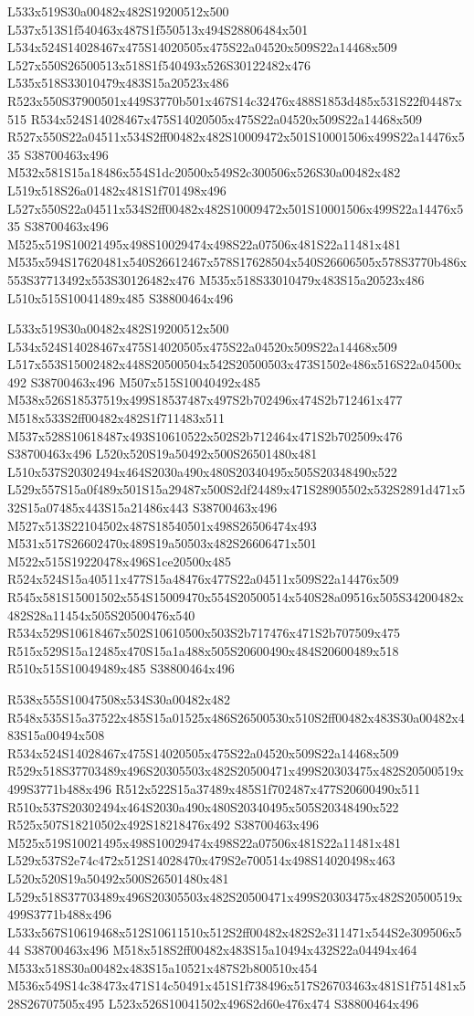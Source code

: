 \documentclass{article}
\begin{document}
\begin{multicols}{2}
L533x519S30a00482x482S19200512x500 L537x513S1f540463x487S1f550513x494S28806484x501 L534x524S14028467x475S14020505x475S22a04520x509S22a14468x509 L527x550S26500513x518S1f540493x526S30122482x476 L535x518S33010479x483S15a20523x486 R523x550S37900501x449S3770b501x467S14c32476x488S1853d485x531S22f04487x515 R534x524S14028467x475S14020505x475S22a04520x509S22a14468x509 R527x550S22a04511x534S2ff00482x482S10009472x501S10001506x499S22a14476x535 S38700463x496 M532x581S15a18486x554S1dc20500x549S2c300506x526S30a00482x482 L519x518S26a01482x481S1f701498x496 L527x550S22a04511x534S2ff00482x482S10009472x501S10001506x499S22a14476x535 S38700463x496 M525x519S10021495x498S10029474x498S22a07506x481S22a11481x481 M535x594S17620481x540S26612467x578S17628504x540S26606505x578S3770b486x553S37713492x553S30126482x476 M535x518S33010479x483S15a20523x486 L510x515S10041489x485 S38800464x496

L533x519S30a00482x482S19200512x500 L534x524S14028467x475S14020505x475S22a04520x509S22a14468x509 L517x553S15002482x448S20500504x542S20500503x473S1502e486x516S22a04500x492 S38700463x496 M507x515S10040492x485 M538x526S18537519x499S18537487x497S2b702496x474S2b712461x477 M518x533S2ff00482x482S1f711483x511 M537x528S10618487x493S10610522x502S2b712464x471S2b702509x476 S38700463x496 L520x520S19a50492x500S26501480x481 L510x537S20302494x464S2030a490x480S20340495x505S20348490x522 L529x557S15a0f489x501S15a29487x500S2df24489x471S28905502x532S2891d471x532S15a07485x443S15a21486x443 S38700463x496 M527x513S22104502x487S18540501x498S26506474x493 M531x517S26602470x489S19a50503x482S26606471x501 M522x515S19220478x496S1ce20500x485 R524x524S15a40511x477S15a48476x477S22a04511x509S22a14476x509 R545x581S15001502x554S15009470x554S20500514x540S28a09516x505S34200482x482S28a11454x505S20500476x540 R534x529S10618467x502S10610500x503S2b717476x471S2b707509x475 R515x529S15a12485x470S15a1a488x505S20600490x484S20600489x518 R510x515S10049489x485 S38800464x496

R538x555S10047508x534S30a00482x482 R548x535S15a37522x485S15a01525x486S26500530x510S2ff00482x483S30a00482x483S15a00494x508 R534x524S14028467x475S14020505x475S22a04520x509S22a14468x509 R529x518S37703489x496S20305503x482S20500471x499S20303475x482S20500519x499S3771b488x496 R512x522S15a37489x485S1f702487x477S20600490x511 R510x537S20302494x464S2030a490x480S20340495x505S20348490x522 R525x507S18210502x492S18218476x492 S38700463x496 M525x519S10021495x498S10029474x498S22a07506x481S22a11481x481 L529x537S2e74c472x512S14028470x479S2e700514x498S14020498x463 L520x520S19a50492x500S26501480x481 L529x518S37703489x496S20305503x482S20500471x499S20303475x482S20500519x499S3771b488x496 L533x567S10619468x512S10611510x512S2ff00482x482S2e311471x544S2e309506x544 S38700463x496 M518x518S2ff00482x483S15a10494x432S22a04494x464 M533x518S30a00482x483S15a10521x487S2b800510x454 M536x549S14c38473x471S14c50491x451S1f738496x517S26703463x481S1f751481x528S26707505x495 L523x526S10041502x496S2d60e476x474 S38800464x496


\end{multicols}
\end{document}
